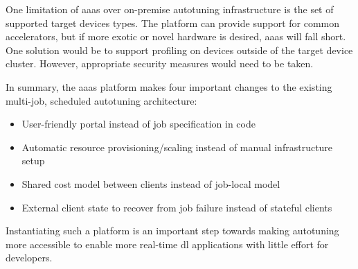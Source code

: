One limitation of \gls{aaas} over on-premise autotuning infrastructure is the set of supported target devices types. The platform can provide support for common accelerators, but if more exotic or novel hardware is desired, \gls{aaas} will fall short. One solution would be to support profiling on devices outside of the target device cluster. However, appropriate security measures would need to be taken.

In summary, the \gls{aaas} platform makes four important changes to the existing multi-job, scheduled autotuning architecture:
\begin{itemize}
	\item User-friendly portal instead of job specification in code
	\item Automatic resource provisioning/scaling instead of manual infrastructure setup
	\item Shared cost model between clients instead of job-local model
	\item External client state to recover from job failure instead of stateful clients
\end{itemize}
Instantiating such a platform is an important step towards making autotuning more accessible to enable more real-time \gls{dl} applications with little effort for developers.